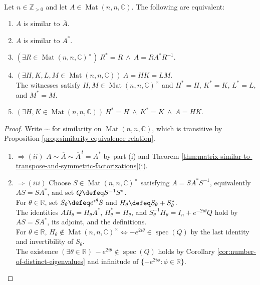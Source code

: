 \begin{theorem} \label{thm:conjugate-similarity-hermitian-product-equivalences} \\
Let $n\in\mathbb{Z}_{>0}$ and let $A\in\operatorname{Mat}(n,n,\mathbb{C})$. The following are equivalent:
\begin{enumerate}[label=(\roman*)]
\setlength{\itemsep}{0pt}
\item $A$ is similar to $\overline{A}$.
\item $A$ is similar to $A^*$.
\item $(\exists R\in\operatorname{Mat}(n,n,\mathbb{C})^\times)\ R^*=R\ \land\ A=RA^*R^{-1}$.
\item $(\exists H,K,L,M\in\operatorname{Mat}(n,n,\mathbb{C}))\ A=HK=LM$.\\
The witnesses satisfy $H,M\in\operatorname{Mat}(n,n,\mathbb{C})^\times$ and $H^*=H$, $K^*=K$, $L^*=L$, and $M^*=M$.
\item $(\exists H,K\in\operatorname{Mat}(n,n,\mathbb{C}))\ H^*=H\ \land\ K^*=K\ \land\ A=HK$.
\end{enumerate}
\begin{proof}
Write $\sim$ for similarity on $\operatorname{Mat}(n,n,\mathbb{C})$, which is transitive by Proposition \ref{prop:similarity-equivalence-relation}.
\begin{enumerate}[label=(\roman*)]
\setlength{\itemsep}{0pt}
\item[$(i)$]$\Rightarrow (ii)$ $A\sim\overline{A}\sim\overline{A}^{\,t}=A^*$ by part (i) and Theorem \ref{thm:matrix-similar-to-transpose-and-symmetric-factorizations}(i).
\item[$(ii)$]$\Rightarrow (iii)$ Choose $S\in\operatorname{Mat}(n,n,\mathbb{C})^\times$ satisfying $A=SA^*S^{-1}$, equivalently $AS=SA^*$, and set $Q\defeq S^{-1}S^*$.\\
For $\theta\in\mathbb{R}$, set $S_{\theta}\defeq e^{i\theta}S$ and $H_{\theta}\defeq S_{\theta}+S_{\theta}^*$.\\
The identities $AH_{\theta}=H_{\theta}A^*$, $H_{\theta}^*=H_{\theta}$, and $S_{\theta}^{-1}H_{\theta}=I_n+e^{-2i\theta}Q$ hold by $AS=SA^*$, its adjoint, and the definitions.\\
For $\theta\in\mathbb{R}$, $H_{\theta}\notin\operatorname{Mat}(n,n,\mathbb{C})^\times\iff-e^{2i\theta}\in\operatorname{spec}(Q)$ by the last identity and invertibility of $S_{\theta}$.\\
The existence $(\exists\theta\in\mathbb{R})\,-e^{2i\theta}\notin\operatorname{spec}(Q)$ holds by Corollary \ref{cor:number-of-distinct-eigenvalues} and infinitude of $\{-e^{2i\phi}:\phi\in\mathbb{R}\}$.\\

\end{enumerate}
\end{proof}
\end{theorem}
